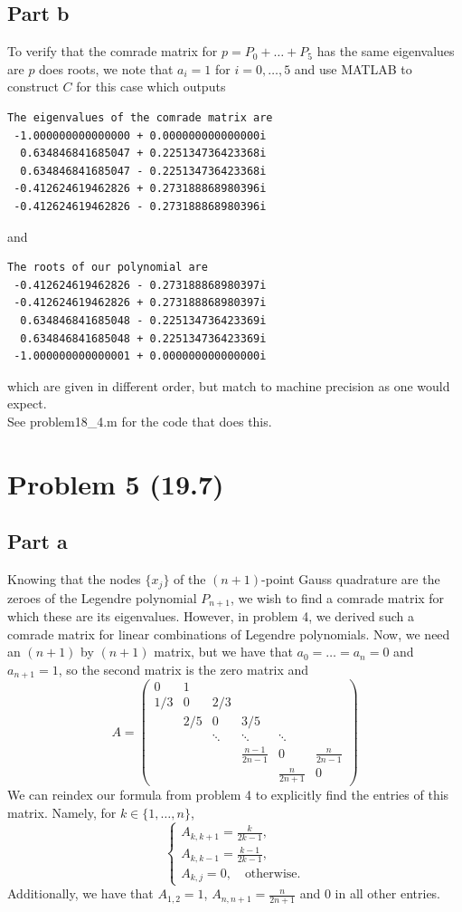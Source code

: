 \documentclass{article}
\begin{document}
\subsection{Part b}
To verify that the comrade matrix for $p=P_0+\ldots+P_5$ has the same eigenvalues are $p$ does roots, we note that $a_i=1$ for $i=0,\ldots,5$ and use MATLAB to construct $C$ for this case which outputs
\begin{verbatim}
The eigenvalues of the comrade matrix are
 -1.000000000000000 + 0.000000000000000i
  0.634846841685047 + 0.225134736423368i
  0.634846841685047 - 0.225134736423368i
 -0.412624619462826 + 0.273188868980396i
 -0.412624619462826 - 0.273188868980396i
\end{verbatim}
and 
\begin{verbatim}
The roots of our polynomial are
 -0.412624619462826 - 0.273188868980397i
 -0.412624619462826 + 0.273188868980397i
  0.634846841685048 - 0.225134736423369i
  0.634846841685048 + 0.225134736423369i
 -1.000000000000001 + 0.000000000000000i
\end{verbatim}
which are given in different order, but match to machine precision as one would expect. \\
See problem18\_4.m for the code that does this.

\section{Problem 5 (19.7)}
\subsection{Part a}
Knowing that the nodes $\{x_j\}$ of the $(n+1)$-point Gauss quadrature are the zeroes of the Legendre polynomial $P_{n+1}$, we wish to find a comrade matrix for which these are its eigenvalues. However, in problem 4, we derived such a comrade matrix for linear combinations of Legendre polynomials. Now, we need an $(n+1)$ by $(n+1)$ matrix, but we have that $a_0=\ldots=a_n=0$ and $a_{n+1}=1$, so the second matrix is the zero matrix and 
\[
A=\begin{pmatrix}
0 & 1   \\
1/3 & 0 & 2/3 \\
 & 2/5 & 0 & 3/5 \\
  & & \ddots & \ddots & \ddots \\
  & & & \frac{n-1}{2n-1} & 0 & \frac{n}{2n-1} \\
  & & & & \frac{n}{2n+1} & 0
\end{pmatrix}
\]
We can reindex our formula from problem 4 to explicitly find the entries of this matrix. Namely, for $k\in\{1,\ldots,n\}$,
\[
\begin{cases}
A_{k,k+1}=\frac{k}{2k-1},\\
A_{k,k-1}=\frac{k-1}{2k-1},\\
A_{k,j}=0, \quad \text{otherwise}.
\end{cases}
\]
Additionally, we have that $A_{1,2}=1$, $A_{n,n+1}=\frac{n}{2n+1}$ and 0 in all other entries. 
\end{document}

